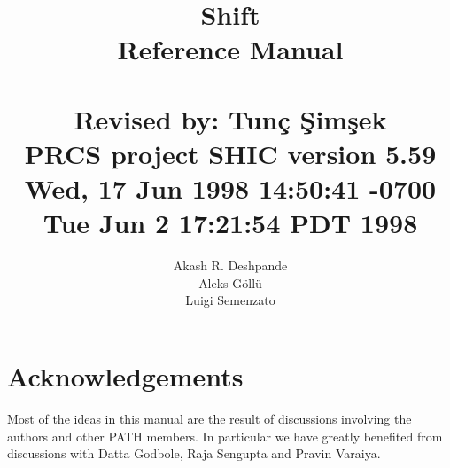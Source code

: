 \documentclass[code,ttimes,11pt,epsf,margins,multicol,comment]{article}
\begin{document}
\newcommand{\Shift}{{\sc Shift}}

\def\todaysname{{\sc Shift}}

\title{\todaysname\\
Reference Manual\\
\ \\
{\normalsize
Revised by: Tun\c{c} \c{S}im\c{s}ek \\
PRCS project SHIC version 5.59\\
Wed, 17 Jun 1998 14:50:41 -0700
Tue Jun  2 17:21:54 PDT 1998 \\
}}

\author{Akash R. Deshpande\\Aleks G\"oll\"u\\Luigi Semenzato\\}

\date{}

\maketitle








\section*{Acknowledgements}

Most of the ideas in this manual are the result of discussions
involving the authors and other PATH members. In particular we have
greatly benefited from discussions with Datta Godbole, Raja Sengupta
and Pravin Varaiya.

\end{document}
